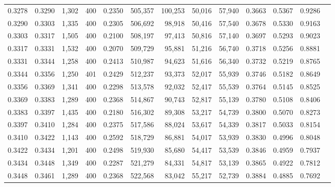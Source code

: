 \begin{tabular}{rrrrrrrrrrrrr}
0.3278 & 0.3290 &  1,302 &   400 &                                     0.2350 & 505,357 & 100,253 &  50,016 &  57,940 & 0.3663 & 0.5367 & 0.9286 \\
0.3290 & 0.3303 &  1,335 &   400 &                                     0.2305 & 506,692 &  98,918 &  50,416 &  57,540 & 0.3678 & 0.5330 & 0.9163 \\
0.3303 & 0.3317 &  1,505 &   400 &                                     0.2100 & 508,197 &  97,413 &  50,816 &  57,140 & 0.3697 & 0.5293 & 0.9023 \\
0.3317 & 0.3331 &  1,532 &   400 &                                     0.2070 & 509,729 &  95,881 &  51,216 &  56,740 & 0.3718 & 0.5256 & 0.8881 \\
0.3331 & 0.3344 &  1,258 &   400 &                                     0.2413 & 510,987 &  94,623 &  51,616 &  56,340 & 0.3732 & 0.5219 & 0.8765 \\
0.3344 & 0.3356 &  1,250 &   401 &                                     0.2429 & 512,237 &  93,373 &  52,017 &  55,939 & 0.3746 & 0.5182 & 0.8649 \\
0.3356 & 0.3369 &  1,341 &   400 &                                     0.2298 & 513,578 &  92,032 &  52,417 &  55,539 & 0.3764 & 0.5145 & 0.8525 \\
0.3369 & 0.3383 &  1,289 &   400 &                                     0.2368 & 514,867 &  90,743 &  52,817 &  55,139 & 0.3780 & 0.5108 & 0.8406 \\
0.3383 & 0.3397 &  1,435 &   400 &                                     0.2180 & 516,302 &  89,308 &  53,217 &  54,739 & 0.3800 & 0.5070 & 0.8273 \\
0.3397 & 0.3410 &  1,284 &   400 &                                     0.2375 & 517,586 &  88,024 &  53,617 &  54,339 & 0.3817 & 0.5033 & 0.8154 \\
0.3410 & 0.3422 &  1,143 &   400 &                                     0.2592 & 518,729 &  86,881 &  54,017 &  53,939 & 0.3830 & 0.4996 & 0.8048 \\
0.3422 & 0.3434 &  1,201 &   400 &                                     0.2498 & 519,930 &  85,680 &  54,417 &  53,539 & 0.3846 & 0.4959 & 0.7937 \\
0.3434 & 0.3448 &  1,349 &   400 &                                     0.2287 & 521,279 &  84,331 &  54,817 &  53,139 & 0.3865 & 0.4922 & 0.7812 \\
0.3448 & 0.3461 &  1,289 &   400 &                                     0.2368 & 522,568 &  83,042 &  55,217 &  52,739 & 0.3884 & 0.4885 & 0.7692 \\

\end{tabular}
